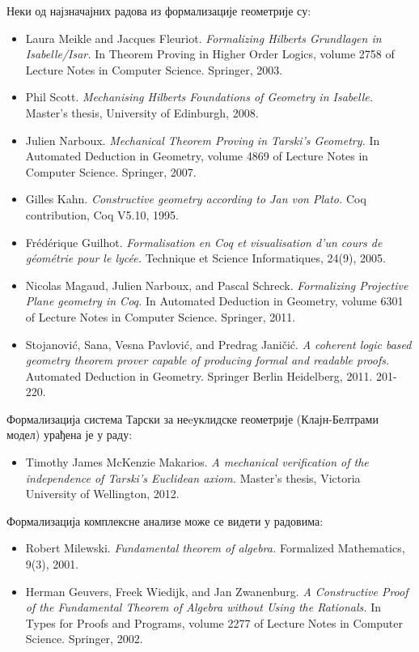 \documentclass[11pt]{article}
\newcommand{\lat}{}
\begin{document}
Неки од најзначајних радова из формализације геометрије су:
\begin{itemize}
\item {\lat Laura Meikle and Jacques Fleuriot. {\em Formalizing
      Hilberts Grundlagen in Isabelle/Isar.}  In Theorem Proving in
    Higher Order Logics, volume 2758 of Lecture Notes in Computer
    Science. Springer, 2003.}

\item {\lat Phil Scott. {\em Mechanising Hilberts Foundations of
      Geometry in Isabelle.} Master’s thesis, University of Edinburgh,
    2008.}

\item {\lat Julien Narboux. {\em Mechanical Theorem Proving in
      Tarski’s Geometry.} In Automated Deduction in Geometry, volume
    4869 of Lecture Notes in Computer Science. Springer, 2007.}

\item {\lat Gilles Kahn. {\em Constructive geometry according to Jan
      von Plato.} Coq contribution, Coq V5.10, 1995.}

\item {\lat Fr\'ed\'erique Guilhot. {\em Formalisation en Coq et
      visualisation d’un cours de g\'eom\'etrie pour le lyc\'ee.}
    Technique et Science Informatiques, 24(9), 2005.}

\item Nicolas Magaud, Julien Narboux, and Pascal Schreck. {\em
    Formalizing Projective Plane geometry in Coq.} In Automated
  Deduction in Geometry, volume 6301 of Lecture Notes in Computer
  Science. Springer, 2011.

\item Stojanović, Sana, Vesna Pavlović, and Predrag Janičić. {\em A coherent logic based geometry theorem prover capable of producing formal and readable proofs.} Automated Deduction in Geometry. Springer Berlin Heidelberg, 2011. 201-220.
\end{itemize}

Формализација система Тарски за неeуклидске геометрије
(Клајн-Белтрами модел) урађена је у раду:
\begin{itemize}
\item {\lat Timothy James McKenzie Makarios. {\em A mechanical verification of the independence of
Tarski’s Euclidean axiom.} Master’s thesis, Victoria University of Wellington, 2012.}
\end{itemize}

Формализација комплексне анализе може се видети у радовима:
\begin{itemize}
\item {\lat Robert Milewski. {\em Fundamental theorem of algebra.} Formalized Mathematics, 9(3), 2001.}

\item {\lat Herman Geuvers, Freek Wiedijk, and Jan Zwanenburg. {\em A Constructive Proof of the
Fundamental Theorem of Algebra without Using the Rationals.} In Types for Proofs and
Programs, volume 2277 of Lecture Notes in Computer Science. Springer, 2002.}
\end{itemize}
\end{document}
